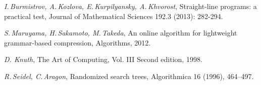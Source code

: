 \documentclass[14pt]{article}
\begin{document}
\begin{thebibliography}{99}
\textsl{I.\,Burmistrov, A.\,Kozlova, E.\,Kurpilyansky, A.\,Khvorost}, Straight-line programs: a practical test,
Journal of Mathematical Sciences 192.3 (2013): 282-294.

\textsl{S.\,Maruyama, H.\,Sakamoto, M.\,Takeda}, An online algorithm for lightweight grammar-based compression, Algorithms, 2012.

\textsl{D. Knuth}, The Art of Computing, Vol. III Second edition, 1998.

\textsl{R.\,Seidel, C.\,Aragon}, Randomized search trees, Algorithmica 16 (1996), 464--497.

\end{thebibliography}
\end{document}
